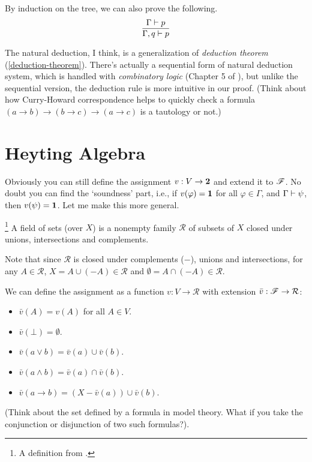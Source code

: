 By induction on the tree, we can also prove the following.
$$
\infer{\Gamma,q\proves p}{\Gamma\proves p}
$$

The natural deduction, I think, is a generalization of {\it deduction theorem}
(\autoref{deduction-theorem}). There's actually a sequential form of natural
deduction system, which is handled with {\it combinatory logic} (Chapter 5
of \cite{Curry-Howard}), but unlike the sequential version, the deduction
rule is more intuitive in our proof. (Think about how Curry-Howard
correspondence helps to quickly check a formula 
$(a\to b)\to (b\to c)\to(a\to c)$ is a tautology or not.)

\section{Heyting Algebra}
Obviously you can still define the assignment $v:V\to\mathbf{2}$ and extend
it to $\mathscr{F}$. No doubt you can find the `soundness' part, i.e.,
if $v(\varphi)=\mathbf{1}$ for all $\varphi\in\Gamma$, and $\Gamma\vdash\psi$,
then $v(\psi)=\mathbf{1}$. Let me make this more general.
\begin{definition}\footnote{A definition from \cite{Curry-Howard}.}
    A field of sets (over $X$) is a nonempty family $\mathcal{R}$ of
    subsets of $X$ closed under unions, intersections and complements. 
\end{definition}
Note that since $\mathcal{R}$ is closed under complements ($-$), unions 
and intersections, for any $A\in\mathcal{R}$, $X=A\cup(-A)\in\mathcal{R}$
and $\emptyset=A\cap(-A)\in\mathcal{R}$.

We can define the assignment as a function $v: V\to\mathcal{R}$ with
extension $\bar{v}:\mathscr{F}\to\mathcal{R}$:
\begin{itemize}
    \item $\bar{v}(A)=v(A)$ for all $A\in V$.
    \item $\bar{v}(\bot)=\emptyset$.
    \item $\bar{v}(a\vee b)=\bar{v}(a)\cup \bar{v}(b)$.
    \item $\bar{v}(a\wedge b)=\bar{v}(a)\cap \bar{v}(b)$.
    \item $\bar{v}(a\to b)=(X-\bar{v}(a))\cup \bar{v}(b)$.
\end{itemize}

(Think about the set defined by a formula in model theory. What if you
take the conjunction or disjunction of two such formulas?).

